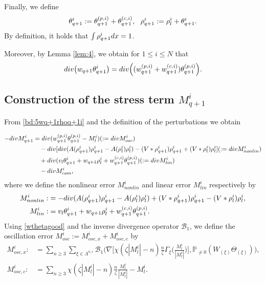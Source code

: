 \documentclass[10pt,a4paper]{amsart}
\numberwithin{equation}{section}
\def\[{{\Big[}}
\def\]{{\Big]}}
\def\({{\Big(}}
\def\){{\Big)}}
\def\dif{{\mathord{{\rm d}}}}
\def\geq{\geqslant}
\def\leq{\leqslant}
\def\div{\mathord{{\rm div}}}
\def\[{{\Big[}}
\def\]{{\Big]}}
\def\({{\Big(}}
\def\){{\Big)}}
\def\dif{{\mathord{{\rm d}}}}
\def\geq{\geqslant}
\def\leq{\leqslant}
\def\div{\mathord{{\rm div}}}
\begin{document}
Finally, we define
\begin{align}
\theta _{q+1}^i:=\theta_{q+1}^{(p,i)}+\theta_{q+1}^{(c,i)},
\ \ 
  \rho^i_{q+1}:=  \rho^i_l+\theta^i _{q+1}.\notag
\end{align}
  By  definition, it  holds that $\int  \rho^i_{q+1}\dif x=1$.



Moreover, by Lemma \ref{lem:4}, we obtain for
$
1\leq i\leq N 
$
that
\begin{align}
\div\bigl(
w_{q+1}\theta_{q+1}^i
\bigr)
=
\div\(
(w_{q+1}^{(p,i)}+w_{q+1}^{(c,i)})
\theta_{q+1}^{(p,i)}
\).
\label{bd:5wq+1rhoq+1i}
\end{align}

 

\subsection{Construction of the stress term $M^i_{q+1}$}\label{sec:5defmq+1}
From  \eqref{bd:5wq+1rhoq+1i}  and the definition of the perturbations 
we obtain

\begin{align*}
 -\div M^i_{q+1}&=\div (w_{q+1}^{(p,i)}\theta_{q+1}^{(p,i)}-M^i_l)(:=\div M^i_{osc})\\
 &\quad-\div[ \div( A(\rho^{i}_{q+1})\rho^{i}_{q+1}-A(\rho^{i}_{l}) \rho^{i}_{l})-(V*\rho_{q+1}^i)\rho_{q+1}^i+(V*\rho_{l}^i)\rho_{l}^i] (:=\div M^i_{nonlin})\notag\\ 
 &\quad+\div(v_l\theta _{q+1}^i+w_{q+1}  \rho^i_l+w_{q+1}^{(c,i)}\theta_{q+1}^{(p,i)})(:=\div M^i_{lin})\\
 &\quad -\div M^i_{com},
\end{align*}
where we  define  the  nonlinear error $ M^i_{nonlin}$ and linear error $M^i_{lin}$ respectively by 
\begin{align*}
M^i_{nonlin}:&=-\div(  A(\rho^i_{q+1} )   \rho^i_{q+1}- A(\rho^i_{l} ) \rho^i_{l}) +(V*\rho_{q+1}^i)\rho_{q+1}^i-(V*\rho_{l}^i)\rho_{l}^i,\\
M^i_{lin}:&=v_l\theta^i _{q+1}+w_{q+1}  \rho^i_l+w_{q+1}^{(c,i)}\theta_{q+1}^{(p,i)}.
\end{align*}  
Using \eqref{wthetagood} and the inverse divergence operator  $\mathcal{B}_1$, we  define  the  oscillation error $M^i_{osc}:=M^i_{osc,x}+M^i_{osc,c}$  by
\begin{align*} M^i_{osc,x}:&=\sum_{n\geq3}\sum_{\xi\in\Lambda^{n,i}}\mathcal{B}_1\(\nabla\[\chi(\zeta |M^i_l|-n)\frac{n}{\zeta }\Gamma_{\xi}\(\frac{M^i_l}{|M^i_l|}\)\],\mathbb{P}_{\neq0}(W_{ (\xi)}\Theta_{ (\xi)})\),\\
   M^i_{osc,c}:&=\sum_{n\geq3}\chi(\zeta |M^i_l|-n)\frac{n}{\zeta }\frac{M^i_l}{|M^i_l|}- M^i_l.
\end{align*}
 
\end{document}
